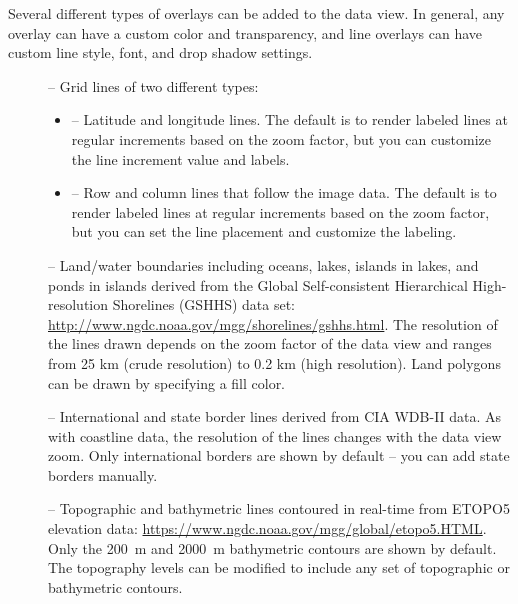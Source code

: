 Several different types of overlays can be added to the data
view.  In general, any overlay can have a custom color and
transparency, and line overlays can have custom line style, font,
and drop shadow settings.
\begin{description}

\item[] -- Grid lines of two different types:
\begin{itemize}

  \item {} -- Latitude and longitude
  lines.  The default is to render labeled lines at regular
  increments based on the zoom factor, but you can customize the
  line increment value and labels.

  \item {} -- Row and column
  lines that follow the image data.  The default is to render
  labeled lines at regular increments based on the zoom factor,
  but you can set the line placement and customize the labeling.

\end{itemize}

\item[] -- Land/water boundaries including
oceans, lakes, islands in lakes, and ponds in islands derived
from the Global Self-consistent Hierarchical High-resolution
Shorelines (GSHHS) data set:
\url{http://www.ngdc.noaa.gov/mgg/shorelines/gshhs.html}.  The
resolution of the lines drawn depends on the zoom factor of the
data view and ranges from 25 km (crude resolution) to 0.2 km
(high resolution).  Land polygons can be drawn by specifying a
fill color.

\item[] -- International and state
border lines derived from CIA WDB-II data.  As with coastline
data, the resolution of the lines changes with the data view
zoom.  Only international borders are shown by default -- you can
add state borders manually.

\item[] -- Topographic and
bathymetric lines contoured in real-time from ETOPO5 elevation
data: \url{https://www.ngdc.noaa.gov/mgg/global/etopo5.HTML}.
Only the 200~m and 2000~m bathymetric contours are shown by
default.  The topography levels can be modified to include any
set of topographic or bathymetric contours.


\end{description}
